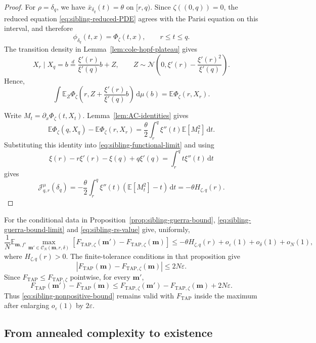 \documentclass[a4paper,10pt,reqno]{amsart}
\numberwithin{equation}{section}
\newcommand{\ve}{\varepsilon}
\newcommand{\dE}{\mathbb{E}}%
\newcommand{\mc}{\mathcal}
\newcommand{\dd}{\mathrm{d}}
\newcommand{\TAP}{\mathrm{TAP}}
\newcommand{\bfm}{\mathbf{m}}
\begin{document}
	\begin{proof}
		For \(\rho=\delta_q\), we have
		\(\bar x_{\delta_q}(t)=\theta\) on \([r,q)\). Since
		\(\zeta((0,q))=0\), the reduced equation
		\eqref{eq:sibling-reduced-PDE} agrees with the Parisi equation on this
		interval, and therefore
		\[
		\phi_{\delta_q}(t,x)=\Phi_\zeta(t,x),
		\qquad r\le t\le q.
		\]
		The transition density in
		Lemma~\ref{lem:cole-hopf-plateau} gives
		\[
		X_r\mid X_q=b
		\stackrel{d}{=}
		\frac{\xi'(r)}{\xi'(q)}b+Z,
		\qquad
		Z\sim\mc N\left(
		0,
		\xi'(r)-\frac{\xi'(r)^2}{\xi'(q)}
		\right).
		\]
		Hence,
		\[
		\int\dE_Z\Phi_\zeta\left(
		r,
		Z+\frac{\xi'(r)}{\xi'(q)}b
		\right)\,\dd\mu(b)
		=
		\dE\Phi_\zeta(r,X_r).
		\]
		
		Write \(M_t=\partial_x\Phi_\zeta(t,X_t)\).
		Lemma~\ref{lem:AC-identities} gives
		\[
		\dE\Phi_\zeta(q,X_q)-\dE\Phi_\zeta(r,X_r)
		=
		\frac{\theta}{2}
		\int_r^q\xi''(t)\dE[M_t^2]\,\dd t.
		\]
		Substituting this identity into
		\eqref{eq:sibling-functional-limit} and using
		\[
		\xi(r)-r\xi'(r)-\xi(q)+q\xi'(q)
		=
		\int_r^q t\xi''(t)\,\dd t
		\]
		gives
		\[
		\mc J_{q,r}^{\mu}(\delta_q)
		=
		-\frac{\theta}{2}
		\int_r^q\xi''(t)
		\left(\dE[M_t^2]-t\right)\,\dd t
		=
		-\theta H_{\zeta,q}(r).
		\]
	\end{proof}
	
	For the conditional data in
	Proposition~\ref{prop:sibling-guerra-bound},
	\eqref{eq:sibling-guerra-bound-limit} and
	\eqref{eq:sibling-rs-value} give, uniformly,
	\begin{equation}\label{eq:sibling-nonpositive-bound}
		\frac1N\dE_{\bfm,f'}
		\max_{\bfm'\in\mc C_N(\bfm,r,\delta)}
		\left[
		F_{\TAP,\zeta}(\bfm')-F_{\TAP,\zeta}(\bfm)
		\right]
		\le
		-\theta H_{\zeta,q}(r)
		+o_\ve(1)+o_\delta(1)+o_N(1),
	\end{equation}
	where \(H_{\zeta,q}(r)>0\).
	The finite-tolerance conditions in that proposition give
	\[
	\left|
	F_{\TAP}(\bfm)-F_{\TAP,\zeta}(\bfm)
	\right|
	\le2N\ve.
	\]
	Since \(F_{\TAP}\le F_{\TAP,\zeta}\) pointwise, for every \(\bfm'\),
	\[
	F_{\TAP}(\bfm')-F_{\TAP}(\bfm)
	\le
	F_{\TAP,\zeta}(\bfm')-F_{\TAP,\zeta}(\bfm)
	+2N\ve.
	\]
	Thus \eqref{eq:sibling-nonpositive-bound} remains valid with
	\(F_{\TAP}\) inside the maximum after enlarging
	\(o_\ve(1)\) by \(2\ve\).
	
	\subsection{From annealed complexity to existence}
	
\end{document}
